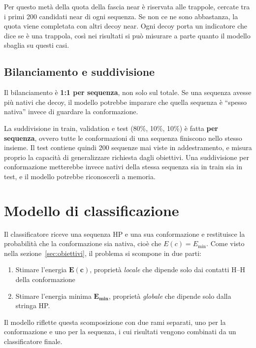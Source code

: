 \documentclass[11pt,a4paper]{article}
\newcommand{\Emin}{E_{\min}}
\begin{document}
Per questo metà della quota della fascia near è riservata alle trappole, cercate tra i primi 200 candidati near di ogni sequenza. Se non ce ne sono abbastanza, la quota viene completata con altri decoy near. Ogni decoy porta un indicatore che dice se è una trappola, così nei risultati si può misurare a parte quanto il modello sbaglia su questi casi.

\subsection{Bilanciamento e suddivisione}
\label{sec:split}

Il bilanciamento è \textbf{1:1 per sequenza}, non solo sul totale. Se una sequenza avesse più nativi che decoy, il modello potrebbe imparare che quella sequenza è ``spesso nativa'' invece di guardare la conformazione.

La suddivisione in train, validation e test (80\%, 10\%, 10\%) è fatta \textbf{per sequenza}, ovvero tutte le conformazioni di una sequenza finiscono nello stesso insieme. Il test contiene quindi 200 sequenze mai viste in addestramento, e misura proprio la capacità di generalizzare richiesta dagli obiettivi. Una suddivisione per conformazione metterebbe invece nativi della stessa sequenza sia in train sia in test, e il modello potrebbe riconoscerli a memoria.

\section{Modello di classificazione}
\label{sec:modello}

Il classificatore riceve una sequenza HP e una sua conformazione e restituisce la probabilità che la conformazione sia nativa, cioè che $E(c) = \Emin$. Come visto nella sezione~\ref{sec:obiettivi}, il problema si scompone in due parti: 
\begin{enumerate}
    \item Stimare l'energia $\boldsymbol{E(c)}$, proprietà \emph{locale} che dipende solo dai contatti H--H della conformazione
    \item Stimare l'energia minima $\boldsymbol{\Emin}$, proprietà \emph{globale} che dipende solo dalla stringa HP.
\end{enumerate}

Il modello riflette questa scomposizione con due rami separati, uno per la conformazione e uno per la sequenza, i cui risultati vengono combinati da un classificatore finale.
\end{document}
